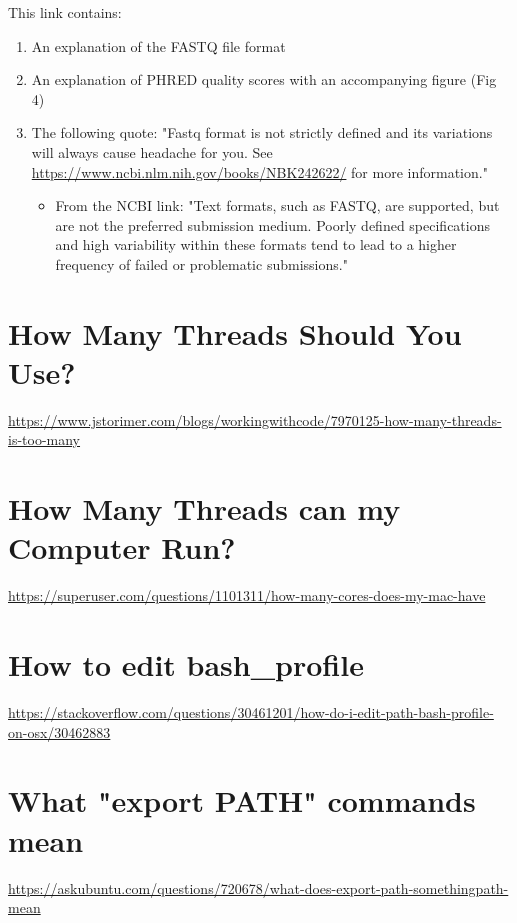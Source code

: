 \begin{fullpage}
    This link contains:
    \begin{enumerate}
    \item An explanation of the FASTQ file format
    \item An explanation of PHRED quality scores with an accompanying figure (Fig 4)
    \item The following quote: "Fastq format is not strictly defined and its variations will always cause headache for you. See \url{https://www.ncbi.nlm.nih.gov/books/NBK242622/} for more information."
        \begin{itemize}
        \item From the NCBI link: "Text formats, such as FASTQ, are supported, but are not the preferred submission medium. Poorly defined specifications and high variability within these formats tend to lead to a higher frequency of failed or problematic submissions."
        \end{itemize}    
    \end{enumerate}
    
    
    \section{How Many Threads Should You Use?}
    \label{app:threads}
    \url{https://www.jstorimer.com/blogs/workingwithcode/7970125-how-many-threads-is-too-many}
    
    
    \section{How Many Threads can my Computer Run?}
    \label{app:threads-resources}
    \url{https://superuser.com/questions/1101311/how-many-cores-does-my-mac-have}




    \section{How to edit bash\_profile}
    \url{https://stackoverflow.com/questions/30461201/how-do-i-edit-path-bash-profile-on-osx/30462883}
    
    \section{What "export PATH" commands mean}
    \url{https://askubuntu.com/questions/720678/what-does-export-path-somethingpath-mean}
    

\end{fullpage}
